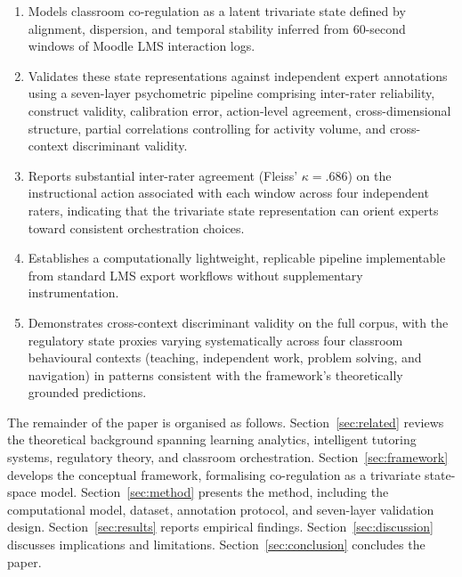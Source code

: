 \documentclass[preprint,12pt,authoryear]{elsarticle}
\begin{document}
\begin{enumerate}

  \item Models classroom co-regulation as a latent trivariate state defined by alignment, dispersion, and temporal stability inferred from 60-second windows of Moodle LMS interaction logs.

  \item Validates these state representations against independent expert annotations using a seven-layer psychometric pipeline comprising inter-rater reliability, construct validity, calibration error, action-level agreement, cross-dimensional structure, partial correlations controlling for activity volume, and cross-context discriminant validity.

  \item Reports substantial inter-rater agreement (Fleiss' $\kappa = .686$) on the instructional action associated with each window across four independent raters, indicating that the trivariate state representation can orient experts toward consistent orchestration choices.

  \item Establishes a computationally lightweight, replicable pipeline implementable from standard LMS export workflows without supplementary instrumentation.

  \item Demonstrates cross-context discriminant validity on the full corpus, with the regulatory state proxies varying systematically across four classroom behavioural contexts (teaching, independent work, problem solving, and navigation) in patterns consistent with the framework's theoretically grounded predictions.

\end{enumerate}

The remainder of the paper is organised as follows. Section~\ref{sec:related} reviews the theoretical background spanning learning analytics, intelligent tutoring systems, regulatory theory, and classroom orchestration. Section~\ref{sec:framework} develops the conceptual framework, formalising co-regulation as a trivariate state-space model. Section~\ref{sec:method} presents the method, including the computational model, dataset, annotation protocol, and seven-layer validation design. Section~\ref{sec:results} reports empirical findings. Section~\ref{sec:discussion} discusses implications and limitations. Section~\ref{sec:conclusion} concludes the paper.
\end{document}
